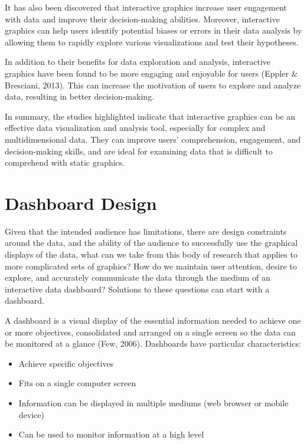 \documentclass[print]{nuthesis}
\begin{document}
It has also been discovered that interactive graphics increase user engagement with data and improve their decision-making abilities.
Moreover, interactive graphics can help users identify potential biases or errors in their data analysis by allowing them to rapidly explore various visualizations and test their hypotheses.

In addition to their benefits for data exploration and analysis, interactive graphics have been found to be more engaging and enjoyable for users (Eppler \& Bresciani, 2013).
This can increase the motivation of users to explore and analyze data, resulting in better decision-making.

In summary, the studies highlighted indicate that interactive graphics can be an effective data visualization and analysis tool, especially for complex and multidimensional data.
They can improve users' comprehension, engagement, and decision-making skills, and are ideal for examining data that is difficult to comprehend with static graphics.

\hypertarget{dashboard-design}{%
\section{Dashboard Design}\label{dashboard-design}}

Given that the intended audience has limitations, there are design constraints around the data, and the ability of the audience to successfully use the graphical displays of the data, what can we take from this body of research that applies to more complicated sets of graphics?
How do we maintain user attention, desire to explore, and accurately communicate the data through the medium of an interactive data dashboard?
Solutions to these questions can start with a dashboard.

A dashboard is a visual display of the essential information needed to achieve one or more objectives, consolidated and arranged on a single screen so the data can be monitored at a glance (Few, 2006).
Dashboards have particular characteristics:

\begin{itemize}
\item
  Achieve specific objectives
\item
  Fits on a single computer screen
\item
  Information can be displayed in multiple mediums (web browser or mobile device)
\item
  Can be used to monitor information at a high level
\end{itemize}
\end{document}
